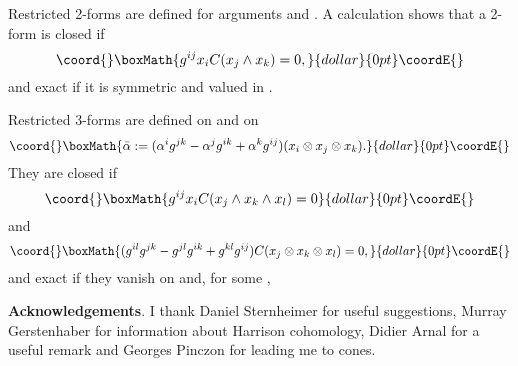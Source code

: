 \documentclass[a4paper,a4paper]{article}
\begin{document}
Restricted 2-forms are defined for arguments \coordHE{} and
\coordHE{}. A calculation shows that a 2-form is closed if
$$\coord{}\boxMath{
g^{ij}x_iC(x_j\wedge x_k) = 0,
}{dollar}{0pt}\coordE{}$$
and exact if it is symmetric and valued in \coordHE{}.
\medskip

Restricted 3-forms are defined on \coordHE{} and on
$$\coord{}\boxMath{
\bar \alpha := (\alpha^ig^{jk} - \alpha^jg^{ik} +
\alpha^kg^{ij})(x_i\otimes x_j \otimes x_k).
}{dollar}{0pt}\coordE{}$$
They are closed if
$$\coord{}\boxMath{
g^{ij}x_i C(x_j\wedge  x_k\wedge  x_l) = 0
}{dollar}{0pt}\coordE{}$$
and 
$$\coord{}\boxMath{
(g^{il}g^{jk} -g^{jl}g^{ik} +g^{kl}g^{ij})C(x_j\otimes x_k \otimes x_l) = 0,
}{dollar}{0pt}\coordE{}$$
and exact if  they vanish on \coordHE{} and, for some
\coordHE{}, \coordHE{}
\medskip

\noindent\textbf{Acknowledgements}. 
I thank Daniel Sternheimer for useful suggestions,  Murray
Gerstenhaber for information about Harrison cohomology, Didier Arnal for
a useful remark and Georges Pinczon for leading me to cones.
\end{document}
